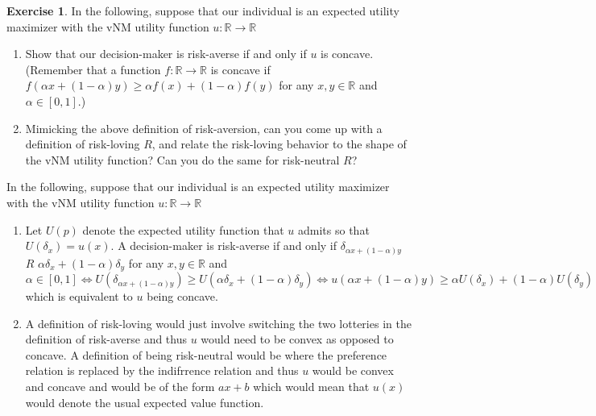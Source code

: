 \documentclass[11pt,oneside]{article}
\numberwithin{equation}{section}
\theoremstyle{definition}
\newtheorem{exercise}{Exercise}
\def\RR{\mathbb{R}}
\newcommand{\IFF}{\Longleftrightarrow}
\begin{document}
\begin{exercise}
 In the following, suppose that our individual is an expected utility maximizer with the vNM utility function $u : \RR \to \RR$
 
 \begin{enumerate}
 
 \item[(a)] Show that our decision-maker is risk-averse if and only if $u$ is concave. (Remember that a function $f : \RR \to \RR$ is concave if $f (\alpha x + (1 - \alpha)y) \geq \alpha f (x) + (1 - \alpha)f (y)$ for any $x, y \in \RR$ and $\alpha \in [0, 1]$.)
 
 \item[(b)] Mimicking the above definition of risk-aversion, can you come up with a definition of risk-loving $R$, and relate the risk-loving behavior to the shape of the vNM utility function? Can you do the same for risk-neutral $R$?
 
 
 \end{enumerate}


\end{exercise} 

\begin{solution}
 In the following, suppose that our individual is an expected utility maximizer with the vNM utility function $u : \RR \to \RR$
 
 \begin{enumerate}
 
 \item[(a)] Let $U(p)$ denote the expected utility function that $u$ admits so that $U(\delta_x) = u(x)$.  A decision-maker is risk-averse if and only if $\delta_{\alpha x + (1-\alpha)y}$ $R$ $\alpha \delta_x + (1-\alpha) \delta_y$ for any $x,y \in \RR$ and $\alpha \in [0,1] \IFF U(\delta_{\alpha x + (1-\alpha)y}) \geq U(\alpha \delta_x + (1-\alpha) \delta_y) \IFF u(\alpha x + (1-\alpha) y) \geq \alpha U(\delta_x) + (1-\alpha) U(\delta_y) \IFF u(\alpha x + (1-\alpha) y)  \geq \alpha u(x) + (1-\alpha) u(y)$ which is equivalent to $u$ being concave. 
 
 \item[(b)]  A definition of risk-loving would just involve switching the two lotteries in the definition of risk-averse and thus $u$ would need to be convex as opposed to concave. A definition of being risk-neutral would be where the preference relation is replaced by the indifrrence relation and thus $u$ would be convex and concave and would be of the form $ax + b$ which would mean that $u(x)$ would denote the usual expected value function. 
 
 \end{enumerate}


\end{solution} 
\end{document}
